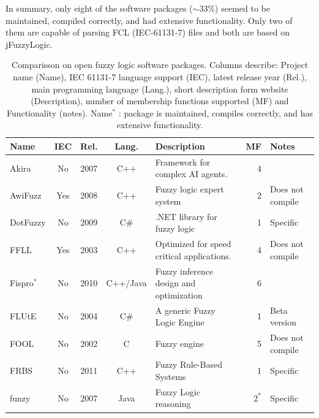 \documentclass[conference]{IEEEtran}
\begin{document}
In summary, only eight of the software packages ($\sim 33\%$) seemed to be maintained, compiled correctly, and had extensive functionality. 
Only two of them are capable of parsing FCL (IEC-61131-7) files and both are based on jFuzzyLogic.

\begin{table}[!t]
	\renewcommand{\arraystretch}{1.3}
	\caption{Comparisson on open fuzzy logic software packages. Columns describe: Project name (Name), IEC 61131-7 language support (IEC), latest release year (Rel.), main programming language (Lang.), short description form website (Description), number of membership functions supported (MF) and Functionality (notes). Name$^{\ast}$ : package is maintained, compiles correctly, and has extensive functionality.}
	\label{t:comp}
	\centering
	\begin{tabular}{|l|c|c|c|l|r|l|}
		\hline
		\textbf{Name}	
			& \textbf{IEC}
			& \textbf{Rel.}
			& \textbf{Lang.} 
			& \textbf{Description}
			& \textbf{MF}
			& \textbf{Notes}	
			\\
		\hline
		Akira				
			& No	
			& 2007 
			& C++
			& Framework for complex AI agents.
			& 4
			&
			\\

		AwiFuzz				
			& Yes	
			& 2008 
			& C++
			& Fuzzy logic expert system
			& 2
			& Does not compile
			\\

		DotFuzzy
			& No	
			& 2009 
			& C\#
			& .NET library for fuzzy logic
			& 1
			& Specific
			\\

		FFLL			
			& Yes	
			& 2003 
			& C++
			& Optimized for speed critical applications.
			& 4
			& Does not compile 
			\\

		Fispro$^{\ast}$
			& No
			& 2010
			& C++/Java
			& Fuzzy inference design and optimization
			& 6
			& 
			\\

		FLUtE			
			& No	
			& 2004 
			& C\#
			& A generic Fuzzy Logic Engine
			& 1
			& Beta version 
			\\

		FOOL
			& No	
			& 2002 
			& C
			& Fuzzy engine
			& 5
			& Does not compile
			\\

		FRBS
			& No
			& 2011
			& C++
			& Fuzzy Rule-Based Systems
			& 1
			& Specific
			\\
			
		funzy
			& No
			& 2007
			& Java
			& Fuzzy Logic reasoning
			& $2^*$
			& Specific
			\\
			

\end{tabular}
\end{table}
\end{document}
